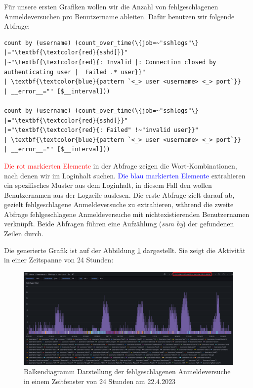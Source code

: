 Für unsere ersten Grafiken wollen wir die Anzahl von fehlgeschlagenen Anmeldeversuchen pro Benutzername ableiten. Dafür benutzen wir folgende Abfrage:

{
\begin{Verbatim}[fontsize=\small,commandchars=\\\{\},frame=single]
count by (username) (count_over_time(\{job=~"sshlogs"\} 
|="\textbf{\textcolor{red}{sshd[}}"
|~"\textbf{\textcolor{red}{: Invalid |: Connection closed by authenticating user |  Failed .* user}}"
| \textbf{\textcolor{blue}{pattern `<_> user <username> <_> port`}}
| __error__="" [$__interval]))

count by (username) (count_over_time(\{job=~"sshlogs"\}
|="\textbf{\textcolor{red}{sshd[}}"
|="\textbf{\textcolor{red}{: Failed" !~"invalid user}}"
| \textbf{\textcolor{blue}{pattern `<_> user <username> <_> port`}}
| __error__="" [$__interval]))
\end{Verbatim}
}

\textcolor{red}{Die rot markierten Elemente} in der Abfrage zeigen die Wort-Kombinationen, nach denen wir im Loginhalt suchen. \textcolor{blue}{Die blau markierten Elemente} extrahieren ein spezifisches Muster aus dem Loginhalt, in diesem Fall den wollen Benutzernamen aus der Logzeile auslesen. Die erste Abfrage zielt darauf ab, gezielt fehlgeschlagene Anmeldeversuche zu extrahieren, während die zweite Abfrage fehlgeschlagene Anmeldeversuche mit nichtexistierenden Benutzernamen verknüpft. Beide Abfragen führen eine Aufzählung (\textit{sum by}) der gefundenen Zeilen durch.

Die generierte Grafik ist auf der Abbildung \ref{fig:2_Anmeldung_BenutzerName} dargestellt. Sie zeigt die Aktivität in einer Zeitspanne von 24 Stunden:

\newpage
{}
\thispagestyle{lscape}
\begin{landscape}
    \begin{figure}[H]
        \centerline{\includegraphics[width=1.5\textwidth]{assets/activityperhour.png}}
        \caption[Balkendiagramm Darstellung der fehlgeschlagenen Anmeldeversuche in einem Zeitfenster von 24 Stunden am ]
        {Balkendiagramm Darstellung der fehlgeschlagenen Anmeldeversuche in einem Zeitfenster von 24 Stunden am 22.4.2023}
        \label{fig:2_Anmeldung_BenutzerName}
        \centering
    \end{figure}
\end{landscape}
\restoregeometry

